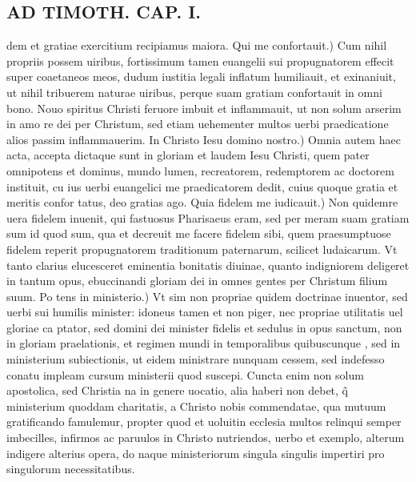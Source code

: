 \documentclass{article}
\begin{document}
\begin{pages}
\section*{AD TIMOTH. CAP. I. }
\marginpar{[ p.473 ]}\pstart dem et gratiae exercitium recipiamus maiora. Qui me confortauit.) Cum nihil propriis possem uiribus, fortissimum tamen euangelii sui propugnatorem effecit super coaetaneos meos, dudum iustitia legali inflatum humiliauit, et exinaniuit, ut nihil tribuerem naturae uiribus, perque suam gratiam confortauit in omni bono. Nouo spiritus Christi feruore imbuit et inflammauit, ut non solum arserim in amo re dei per Christum, sed etiam uehementer multos uerbi praedicatione alios passim inflammauerim. In Christo Iesu domino nostro.) Omnia autem haec acta, accepta dictaque sunt in gloriam et laudem Iesu Christi, quem pater omnipotens et dominus, mundo lumen, recreatorem, redemptorem ac doctorem instituit, cu ius uerbi euangelici me praedicatorem dedit, cuius quoque gratia et meritis confor tatus, deo gratias ago. Quia fidelem me iudicauit.) Non quidemre uera fidelem inuenit, qui fastuosus Pharisaeus eram, sed per meram suam gratiam sum id quod sum, qua et decreuit me facere fidelem sibi, quem praesumptuose fidelem reperit propugnatorem traditionum paternarum, scilicet ludaicarum. Vt tanto clarius elucesceret eminentia bonitatis diuinae, quanto indigniorem deligeret in tantum opus, ebuccinandi gloriam dei in omnes gentes per Christum filium suum. Po tens in ministerio.) Vt sim non propriae quidem doctrinae inuentor, sed uerbi sui humilis minister: idoneus tamen et non piger, nec propriae utilitatis uel gloriae ca ptator, sed domini dei minister fidelis et sedulus in opus sanctum, non in gloriam praelationis, et regimen mundi in temporalibus quibuscunque , sed in ministerium subiectionis, ut eidem ministrare nunquam cessem, sed indefesso conatu impleam cursum ministerii quod suscepi. Cuncta enim non solum apostolica, sed Christia na in genere uocatio, alia haberi non debet, q̃ ministerium quoddam charitatis, a Christo nobis commendatae, qua mutuum gratificando famulemur, propter quod et uoluitin ecclesia multos relinqui semper imbecilles, infirmos ac paruulos in Christo nutriendos, uerbo et exemplo, alterum indigere alterius opera, do naque ministeriorum singula singulis impertiri pro singulorum necessitatibus.  \pend
{}
{}

\end{pages}
\end{document}
